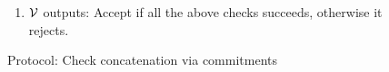 \begin{figure}[htbp]
\begin{mdframed}
{\begin{enumerate}[leftmargin=2em]
\begin{itemize}[leftmargin=2em]
                \item $\kzgverify(\srs,\gone{h}, s^3, \val{s^3}{h},\Pi_h)$.
                \item $\kzgverify(\srs,\gone{f}, s, \val{s}{Z} + r\val{s}{Q}, \Pi_f)$.
                \item $\val{s}{Q}\cdot \val{s}{Z} =? \val{s^3}{h}-\val{s}{v}-\gamma \val{\omega^m s}{v}-\gamma^2\val{\omega^{2m}s}{v}$.
            \end{itemize}
            \item $\mathcal{V}$ outputs: Accept if all the above checks succeeds, otherwise it rejects.
        \end{enumerate}
    }
    \end{mdframed}
    \vspace*{-5mm}
    \caption{Protocol: Check concatenation via commitments}
    \label{fig:concatenation}
\end{figure}

